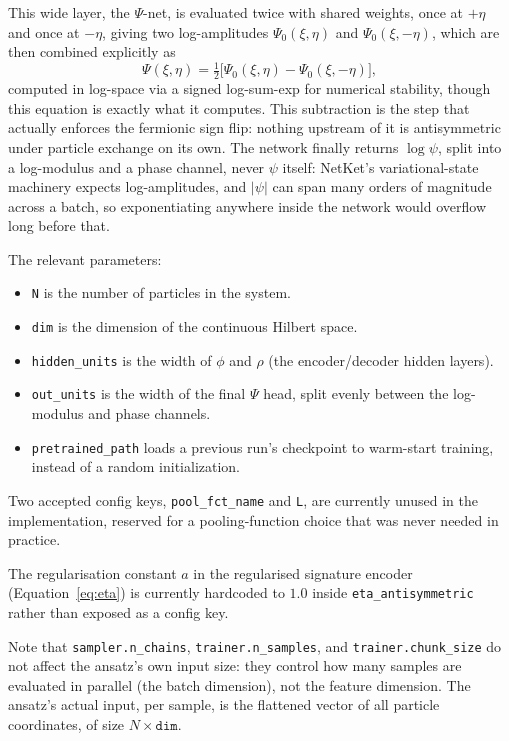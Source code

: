 \documentclass[a4paper,11pt,twoside]{article}
\begin{document}
This wide layer, the $\Psi$-net, is evaluated twice with shared weights, once at $+\eta$ and once at $-\eta$, giving two log-amplitudes $\Psi_0(\xi,\eta)$ and $\Psi_0(\xi,-\eta)$, which are then combined explicitly as
\begin{equation}
    \Psi(\xi,\eta) = \tfrac{1}{2}\big[\Psi_0(\xi,\eta) - \Psi_0(\xi,-\eta)\big],
\end{equation}
computed in log-space via a signed log-sum-exp for numerical stability, though this equation is exactly what it computes. This subtraction is the step that actually enforces the fermionic sign flip: nothing upstream of it is antisymmetric under particle exchange on its own. The network finally returns $\log\psi$, split into a log-modulus and a phase channel, never $\psi$ itself: NetKet's variational-state machinery expects log-amplitudes, and $|\psi|$ can span many orders of magnitude across a batch, so exponentiating anywhere inside the network would overflow long before that.

The relevant parameters:
\begin{itemize}
    \item \texttt{N} is the number of particles in the system.
    \item \texttt{dim} is the dimension of the continuous Hilbert space.
    \item \texttt{hidden\_units} is the width of $\phi$ and $\rho$ (the encoder/decoder hidden layers).
    \item \texttt{out\_units} is the width of the final $\Psi$ head, split evenly between the log-modulus and phase channels.
    \item \texttt{pretrained\_path} loads a previous run's checkpoint to warm-start training, instead of a random initialization.
\end{itemize}

Two accepted config keys, \texttt{pool\_fct\_name} and \texttt{L}, are currently unused in the implementation, reserved for a pooling-function choice that was never needed in practice.

The regularisation constant $a$ in the regularised signature encoder (Equation~\ref{eq:eta}) is currently hardcoded to $1.0$ inside \texttt{eta\_antisymmetric} rather than exposed as a config key.

Note that \texttt{sampler.n\_chains}, \texttt{trainer.n\_samples}, and \texttt{trainer.chunk\_size} do not affect the ansatz's own input size: they control how many samples are evaluated in parallel (the batch dimension), not the feature dimension. The ansatz's actual input, per sample, is the flattened vector of all particle coordinates, of size $N \times \texttt{dim}$.
\end{document}
